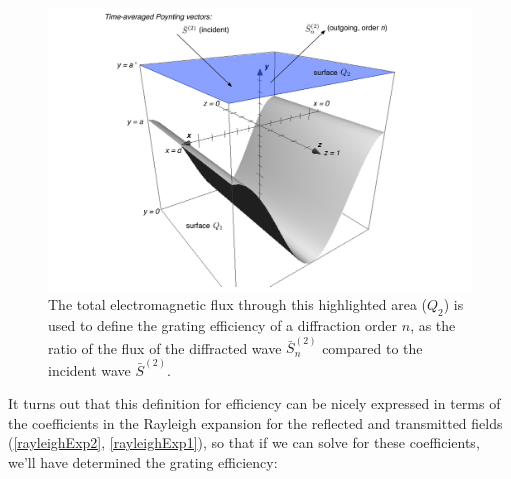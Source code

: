 \begin{figure}[htbp] %
   \centering
   \includegraphics[scale=0.6]{../data/Chapter2/2c_poynting/2c.pdf} 
   \caption{The total electromagnetic flux through this highlighted area ($Q_2$) is used to define the grating efficiency of a diffraction order $n$, as the ratio of the flux of the diffracted wave $\bar S_n^{(2)}$ compared to the incident wave $\bar S^{(2)}$.}
   \label{2c}
\end{figure}

It turns out that this definition for efficiency can be nicely expressed in terms of the coefficients in the Rayleigh expansion for the reflected and transmitted fields (\ref{rayleighExp2}, \ref{rayleighExp1}), so that if we can solve for these coefficients, we'll have determined the grating efficiency:
